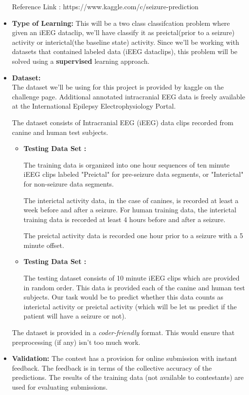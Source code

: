 \documentclass[11pt]{article}
\begin{document}
\begin{itemize}
Reference Link : https://www.kaggle.com/c/seizure-prediction

\item
\textbf{Type of Learning:} This will be a two class classifcation problem where given an iEEG dataclip, we'll have classify it as preictal(prior to a seizure) activity or interictal(the baseline state) activity. Since we'll be working with datasets that contained labeled data (iEEG dataclips), this problem will be solved using a \textbf{supervised} learning approach.

\item \textbf{Dataset:}\\
The dataset we'll be using for this project is provided by kaggle on the challenge page. Additional annotated intracranial EEG data is freely available at the International Epilepsy Electrophysiology Portal.

The dataset consists of Intracranial EEG (iEEG) data clips recorded from canine and human test subjects.

\begin{itemize}
\item \textbf{Testing Data Set :} 

The training data is organized into one hour sequences of ten minute iEEG clips labeled "Preictal" for pre-seizure data segments, or "Interictal" for non-seizure data segments. 

The interictal activity data, in the case of canines, is recorded at least a week before and after a seizure. For human training data, the interictal training data is recorded at least 4 hours before and after a seizure.

The preictal activity data is recorded one hour prior to a seizure with a 5 minute offset.

\item \textbf{Testing Data Set :} 

The testing dataset consists of 10 minute iEEG clips which are provided in random order. This data is provided each of the canine and human test subjects. Our task would be to predict whether this data counts as interictal activity or preictal activity (which will be let us predict if the patient will have a seizure or not).

\end{itemize}
The dataset is provided in a \textit{coder-friendly} format. This would ensure that preprocessing (if any) isn't too much work. \\

\item \textbf{Validation:}
The contest has a provision for online submission with instant feedback. The feedback is in terms of the collective accuracy of the predictions. The results of the training data (not available to contestants) are used for evaluating submissions.


\end{itemize}
\end{document}
